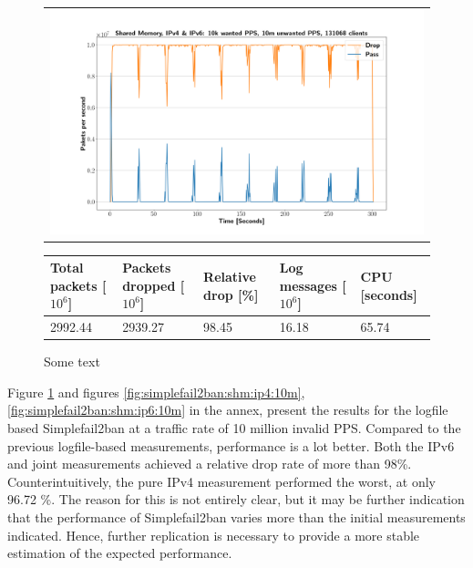 \begin{figure}[!h]
	\label{fig:simplefail2ban:shm:ip46:10m}
	\centering
	\scriptsize
	\begin{tabular}{c}
    	\centerline{\includegraphics[width=1.2\textwidth]{images/simplefail2ban_shm_ipv46_v10k_iv10m_c131068.png}}
	\end{tabular}
	\begin{tabular}{lllll}
		\toprule
		\textbf{Total packets [$10^6$]} & \textbf{Packets dropped [$10^6$]} & \textbf{Relative drop [\%]} & \textbf{Log messages [$10^6$]} & \textbf{CPU [seconds]} \\ \midrule 
		2992.44 & 2939.27 & 98.45 & 16.18 & 65.74 \\
		\bottomrule
	\end{tabular}
	\caption[Simplefail2ban, Shared Memory, IPv4 \& IPv6, 10m \ac{PPS}]{Some text}
\end{figure}

Figure \ref{fig:simplefail2ban:shm:ip46:10m} and figures \ref{fig:simplefail2ban:shm:ip4:10m}, \ref{fig:simplefail2ban:shm:ip6:10m} in the annex, present the results
for the logfile based Simplefail2ban at a traffic rate of 10 million invalid \ac{PPS}. Compared to the previous logfile-based measurements,
performance is a lot better. Both the \ac{IPv6} and joint measurements achieved a relative drop rate of more than 98\%. Counterintuitively, the
pure \ac{IPv4} measurement performed the worst, at only 96.72 \%. The reason for this is not entirely clear, but it may be further
indication that the performance of Simplefail2ban varies more than the initial measurements indicated. Hence, further replication
is necessary to provide a more stable estimation of the expected performance. 

